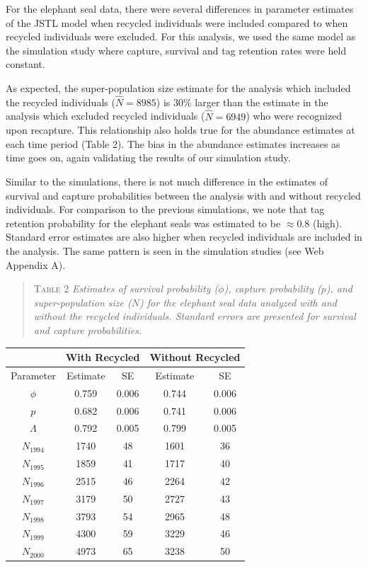 \documentclass[12pt]{article}
\begin{document}
For the elephant seal data, there were several differences in parameter
estimates of the JSTL model when recycled individuals were included
compared to when recycled individuals were excluded. For this analysis, we used the same model as the simulation study where capture, survival and tag retention rates were held constant.  

As expected, the
super-population size estimate for the analysis which included the
recycled individuals ($\hat{N}=8985$) is 30\% larger than the estimate in the analysis
which excluded recycled individuals ($\hat{N}=6949$) who were recognized upon recapture. This relationship also holds true for the abundance estimates
at each time period (Table 2). The bias in the abundance estimates increases
 as time goes on, again validating the results of our
simulation study.

Similar to the simulations, there is not much difference in the
estimates of survival and capture probabilities between the analysis
with and without recycled individuals. For comparison to the previous
simulations, we note that tag retention probability for the
elephant seals was estimated to be $\approx 0.8$ (high).  Standard error estimates are also higher when recycled individuals are included in the analysis. The same pattern is seen in the simulation studies (see Web Appendix A).

\begin{quote}
\textsc{Table 2}
\textsl{Estimates of survival probability ($\phi$), capture probability ($p$), and super-population size ($N$) for the elephant seal data analyzed with and without the recycled individuals. Standard errors are presented for survival and capture probabilities.}
\end{quote}

\begin{center}
\begin{tabular}{c c c c c}
& \multicolumn{2}{l}{With Recycled} & \multicolumn{2}{l}{Without Recycled} \\ \hline
Parameter & Estimate & SE & Estimate & SE \\ \hline
$\phi$ & 0.759 & 0.006 & 0.744 & 0.006\\
$p$ & 0.682 & 0.006 & 0.741 & 0.006 \\
$\Lambda $ & 0.792 & 0.005 & 0.799 & 0.005\\ \hline
$N_{1994}$ & 1740 & 48 & 1601 & 36 \\
$N_{1995}$ & 1859 & 41 & 1717 & 40 \\
$N_{1996}$ & 2515 & 46 & 2264 & 42 \\
$N_{1997}$ & 3179 & 50 & 2727 & 43 \\
$N_{1998}$ & 3793 & 54 & 2965 & 48 \\
$N_{1999}$ & 4300 & 59 & 3229 & 46 \\
$N_{2000}$ & 4973 & 65 & 3238 & 50 \\ \hline
\end{tabular}
\end{center}
\end{document}
